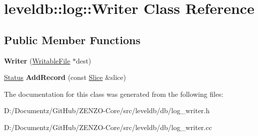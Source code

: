 \hypertarget{classleveldb_1_1log_1_1_writer}{}\section{leveldb\+::log\+::Writer Class Reference}
\label{classleveldb_1_1log_1_1_writer}
\subsection*{Public Member Functions}
\begin{DoxyCompactItemize}
\item 
\mbox{\label{classleveldb_1_1log_1_1_writer_a424f67be4485fdf3ef8ba55c9c559c90}} 
{\bfseries Writer} (\mbox{\hyperlink{classleveldb_1_1_writable_file}{Writable\+File}} $\ast$dest)
\item 
\mbox{\label{classleveldb_1_1log_1_1_writer_acb4abda5a5348ac1771657ff01bf2fad}} 
\mbox{\hyperlink{classleveldb_1_1_status}{Status}} {\bfseries Add\+Record} (const \mbox{\hyperlink{classleveldb_1_1_slice}{Slice}} \&slice)
\end{DoxyCompactItemize}


The documentation for this class was generated from the following files\+:\begin{DoxyCompactItemize}
\item 
D\+:/\+Documentz/\+Git\+Hub/\+Z\+E\+N\+Z\+O-\/\+Core/src/leveldb/db/log\+\_\+writer.\+h\item 
D\+:/\+Documentz/\+Git\+Hub/\+Z\+E\+N\+Z\+O-\/\+Core/src/leveldb/db/log\+\_\+writer.\+cc\end{DoxyCompactItemize}
